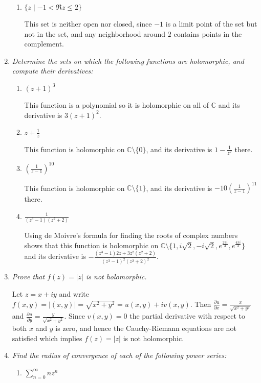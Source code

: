 \documentclass[letterpaper, 11pt]{article}
\begin{document}
\begin{enumerate}
\begin{enumerate}
\item \emph{$\{z \mid -1 < \Re z \leq 2\}$}

This set is neither open nor closed, since $-1$ is a limit point of the set but not in the set, and any neighborhood around $2$ contains points in the complement.

\end{enumerate}

\item \emph{Determine the sets on which the following functions are holomorphic, and compute their derivatives:}
\begin{enumerate}
\item \emph{$(z+1)^3$}

This function is a polynomial so it is holomorphic on all of $\mathbb{C}$ and its derivative is $3(z+1)^2$.
\item \emph{$z + \frac{1}{z}$}

This function is holomorphic on $\mathbb{C} \setminus \{0\}$, and its derivative is $1 - \frac{1}{z^2}$ there.
\item \emph{$\left(\frac{1}{z-1}\right)^{10}$}

This function is holomorphic on $\mathbb{C} \setminus \{1\}$, and its derivative is $-10\left(\frac{1}{z-1}\right)^{11}$ there.

\item \emph{$\frac{1}{(z^3-1)(z^2+2)}$}

Using de Moivre's formula for finding the roots of complex numbers shows that this function is holomorphic on $\mathbb{C} \setminus \{1, i\sqrt{2}, -i\sqrt{2}, e^{\frac{2 \pi i}{3}}, e^{\frac{4 \pi i}{3}} \}$ and its derivative is $-\frac{(z^3-1)2z + 3z^2(z^2+2)}{(z^3-1)^2(z^2+2)^2}$.
\end{enumerate}

\item \emph{Prove that $f(z) = |z|$ is not holomorphic.}

Let $z = x + iy$ and write $f(x,y) = |(x,y)| = \sqrt{x^2 + y^2} = u(x,y) + iv(x,y)$.  Then $\frac{\partial u}{\partial x} = \frac{x}{\sqrt{x^2+y^2}}$ and $\frac{\partial u}{\partial y} = \frac{y}{\sqrt{x^2+y^2}}$.  Since $v(x,y) = 0$ the partial derivative with respect to both $x$ and $y$ is zero, and hence the Cauchy-Riemann equations are not satisfied which implies $f(z) = |z|$ is not holomorphic.

\item \emph{Find the radius of convergence of each of the following power series:}
\begin{enumerate}
\item \emph{$\sum_{n=0}^\infty nz^n$}


\end{enumerate}
\end{enumerate}
\end{document}
